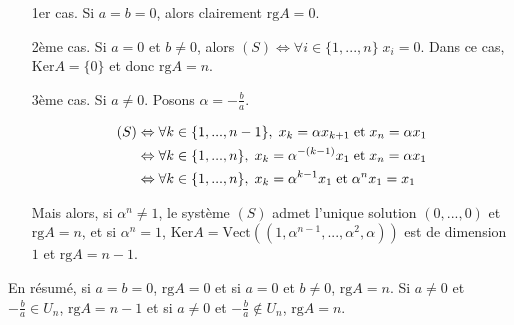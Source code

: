 {{\begin{enumerate}
\begin{itemize}
\item[1er cas.] Si $a=b=0$, alors clairement $\mbox{rg}A=0$.

\item[2ème cas.] Si $a=0$ et $b\neq0$, alors $(S)\Leftrightarrow\forall i\in\{1,...,n\}\;x_i=0$. Dans ce cas, $\mbox{Ker}A=\{0\}$ et donc $\mbox{rg}A=n$.

\item[3ème cas.] Si $a\neq0$. Posons $\alpha=-\frac{b}{a}$.

\begin{align*}\ensuremath
(S)&\Leftrightarrow\forall k\in\{1,...,n-1\},\;x_k=\alpha x_{k+1}\;\mbox{et}\;x_n=\alpha x_1\\
 &\Leftrightarrow\forall k\in\{1,...,n\},\;x_k=\alpha^{-(k-1)}x_1\;\mbox{et}\;x_n=\alpha x_1\\
 &\Leftrightarrow\forall k\in\{1,...,n\},\;x_k=\alpha^{k-1}x_1\;\mbox{et}\;\alpha^n x_1=x_1
\end{align*}

Mais alors, si $\alpha^n\neq1$, le système $(S)$ admet l'unique solution $(0,...,0)$ et $\mbox{rg}A=n$, et si $\alpha^n=1$, $\mbox{Ker}A=\mbox{Vect}((1,\alpha^{n-1},...,\alpha^2,\alpha))$ est de dimension $1$ et $\mbox{rg}A=n-1$.
\end{itemize}

En résumé, si $a=b=0$, $\mbox{rg}A=0$ et si $a=0$ et $b\neq0$, $\mbox{rg}A=n$. Si $a\neq0$ et $-\frac{b}{a}\in U_n$, $\mbox{rg}A=n-1$ et si $a\neq0$ et $-\frac{b}{a}\notin U_n$, $\mbox{rg}A=n$.
\end{enumerate}}
}